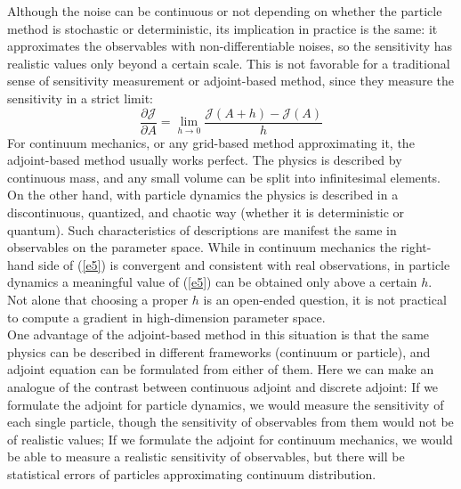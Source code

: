 \documentclass[11pt]{article}
\def\Dpartial#1#2{ \frac{\partial #1}{\partial #2} }
\newcommand{\cJ}{\mathcal{J}}
\begin{document}
Although the noise can be continuous or not depending on whether the particle method is stochastic or deterministic,
its implication in practice is the same:
it approximates the observables with non-differentiable noises,
so the sensitivity has realistic values only beyond a certain scale.
This is not favorable for a traditional sense of sensitivity measurement or adjoint-based method,
since they measure the sensitivity in a strict limit:
\begin{equation}
\Dpartial{\cJ}{A} = \lim_{h\to0} \frac{\cJ(A+h) - \cJ(A)}{h}
\label{e5}
\end{equation}
For continuum mechanics, or any grid-based method approximating it,
the adjoint-based method usually works perfect.
The physics is described by continuous mass,
and any small volume can be split into infinitesimal elements.
On the other hand, with particle dynamics
the physics is described in a discontinuous, quantized, and chaotic way (whether it is deterministic or quantum).
Such characteristics of descriptions are manifest the same in observables on the parameter space.
While in continuum mechanics the right-hand side of (\ref{e5}) is convergent and consistent with real observations,
in particle dynamics a meaningful value of (\ref{e5}) can be obtained only above a certain $h$.
Not alone that choosing a proper $h$ is an open-ended question,
it is not practical to compute a gradient in high-dimension parameter space.\\
One advantage of the adjoint-based method in this situation is
that the same physics can be described in different frameworks (continuum or particle),
and adjoint equation can be formulated from either of them.
Here we can make an analogue of the contrast between continuous adjoint and discrete adjoint:
If we formulate the adjoint for particle dynamics,
we would measure the sensitivity of each single particle,
though the sensitivity of observables from them would not be of realistic values;
If we formulate the adjoint for continuum mechanics,
we would be able to measure a realistic sensitivity of observables,
but there will be statistical errors of particles approximating continuum distribution.


\printbibliography
\end{document}
